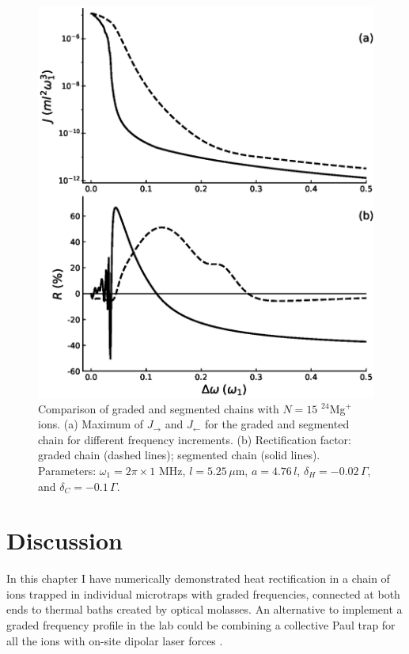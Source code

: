 \begin{figure}
  \center
  \includegraphics[width=0.85\linewidth]{Figures/24Mg_Comparacion_Graded_AND_Segmented.eps}
  \caption{Comparison of graded and segmented chains with $N=15$ $^{24}$Mg$^+$ ions. (a) Maximum
  of $J_\rightarrow$ and $J_\leftarrow$
   for the graded and segmented chain for different frequency increments. (b) Rectification factor: graded chain (dashed lines); segmented chain (solid lines). Parameters: $\omega_1 = 2 \pi \times 1$ MHz, $l = 5.25\,\mu$m, $a = 4.76 \, l$, $\delta_H = -0.02 \, \Gamma$, and $\delta_C = -0.1 \, \Gamma$.}
  \label{fig:GS}
\end{figure}

\section{Discussion\label{sec:chapter5_Discussion}}
%
In this chapter I have numerically demonstrated heat rectification in a chain of ions trapped in individual microtraps with graded frequencies, connected at both ends to thermal baths
created by optical molasses. An alternative to implement a graded
frequency profile in the lab
could be combining a collective Paul trap for all the ions with on-site dipolar laser forces \cite{Freitas2015,Enderlein2012,Bermudez2013,Schneider2010}.

